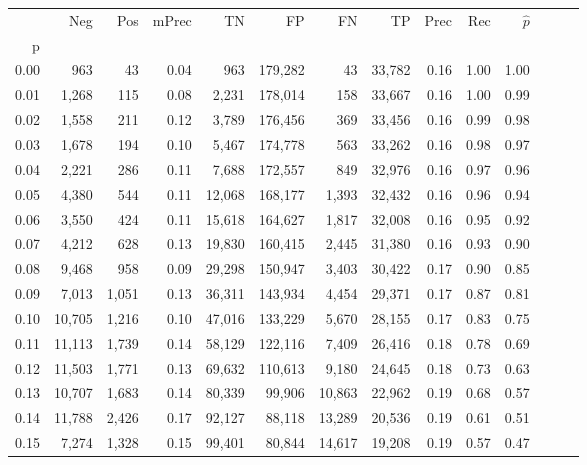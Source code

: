 \begin{tabular}{rrrrrrrrrrrrrr}
\toprule
{} &     Neg &    Pos & mPrec &       TN &       FP &      FN &      TP &  Prec &   Rec & $\hat{p}$ \\
p    &         &        &       &          &          &         &         &       &       &           \\
\midrule
0.00 &     963 &     43 &  0.04 &      963 &  179,282 &      43 &  33,782 &  0.16 &  1.00 &      1.00 \\
0.01 &   1,268 &    115 &  0.08 &    2,231 &  178,014 &     158 &  33,667 &  0.16 &  1.00 &      0.99 \\
0.02 &   1,558 &    211 &  0.12 &    3,789 &  176,456 &     369 &  33,456 &  0.16 &  0.99 &      0.98 \\
0.03 &   1,678 &    194 &  0.10 &    5,467 &  174,778 &     563 &  33,262 &  0.16 &  0.98 &      0.97 \\
0.04 &   2,221 &    286 &  0.11 &    7,688 &  172,557 &     849 &  32,976 &  0.16 &  0.97 &      0.96 \\
0.05 &   4,380 &    544 &  0.11 &   12,068 &  168,177 &   1,393 &  32,432 &  0.16 &  0.96 &      0.94 \\
0.06 &   3,550 &    424 &  0.11 &   15,618 &  164,627 &   1,817 &  32,008 &  0.16 &  0.95 &      0.92 \\
0.07 &   4,212 &    628 &  0.13 &   19,830 &  160,415 &   2,445 &  31,380 &  0.16 &  0.93 &      0.90 \\
0.08 &   9,468 &    958 &  0.09 &   29,298 &  150,947 &   3,403 &  30,422 &  0.17 &  0.90 &      0.85 \\
0.09 &   7,013 &  1,051 &  0.13 &   36,311 &  143,934 &   4,454 &  29,371 &  0.17 &  0.87 &      0.81 \\
0.10 &  10,705 &  1,216 &  0.10 &   47,016 &  133,229 &   5,670 &  28,155 &  0.17 &  0.83 &      0.75 \\
0.11 &  11,113 &  1,739 &  0.14 &   58,129 &  122,116 &   7,409 &  26,416 &  0.18 &  0.78 &      0.69 \\
0.12 &  11,503 &  1,771 &  0.13 &   69,632 &  110,613 &   9,180 &  24,645 &  0.18 &  0.73 &      0.63 \\
0.13 &  10,707 &  1,683 &  0.14 &   80,339 &   99,906 &  10,863 &  22,962 &  0.19 &  0.68 &      0.57 \\
0.14 &  11,788 &  2,426 &  0.17 &   92,127 &   88,118 &  13,289 &  20,536 &  0.19 &  0.61 &      0.51 \\
0.15 &   7,274 &  1,328 &  0.15 &   99,401 &   80,844 &  14,617 &  19,208 &  0.19 &  0.57 &      0.47 \\

\end{tabular}
